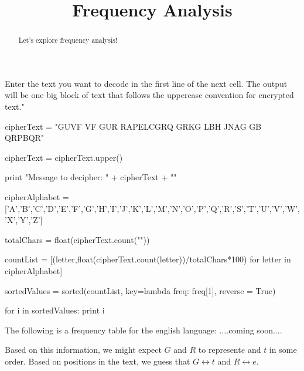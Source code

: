 \documentclass[handout]{ximera}
\title{Frequency Analysis}
\begin{document}
\begin{abstract}{Let's explore frequency analysis!}\end{abstract}


Enter the text you want to decode in the first line of the next cell.  The output will be one big block of text that follows the uppercase convention for encrypted text."

\begin{python}
cipherText = "GUVF VF GUR RAPELCGRQ GRKG LBH JNAG GB QRPBQR"

cipherText = cipherText.upper()

print "Message to decipher: " + cipherText + ""

cipherAlphabet = ['A','B','C','D','E','F','G','H','I','J','K','L','M','N','O','P','Q','R','S','T','U','V','W','X','Y','Z']

totalChars = float(cipherText.count(""))

countList = [(letter,float(cipherText.count(letter))/totalChars*100) for letter in cipherAlphabet]

sortedValues = sorted(countList, key=lambda freq: freq[1], reverse = True)

for i in sortedValues:
	print i
\end{python}

The following is a frequency table for the english language: ....coming soon....


Based on this information, we might expect $G$ and $R$ to represent$ e$ and $t$ in some order.  Based on positions in the text, we guess that $G \leftrightarrow t$ and $R \leftrightarrow e$.
\end{document}
